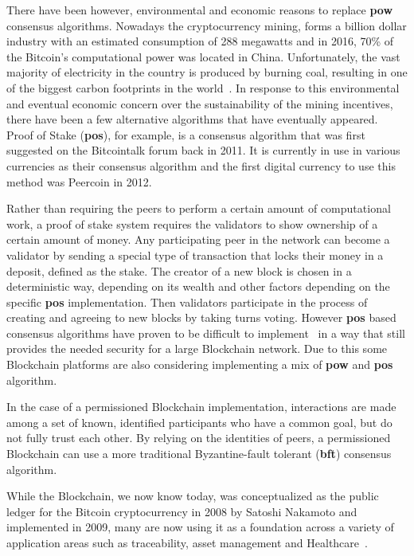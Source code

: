 There have been however, environmental and economic reasons to replace
\textbf{pow} consensus algorithms. Nowadays the cryptocurrency mining, forms a
billion dollar industry with an estimated consumption of 288 megawatts and in
2016, 70\% of the Bitcoin's computational power was located in China.
Unfortunately, the vast majority of electricity in the country is produced by
burning coal, resulting in one of the biggest carbon footprints in the
world~\cite{BitcoinMining2017}. In response to this environmental and eventual
economic concern over the sustainability of the mining incentives, there have
been a few alternative algorithms that have eventually appeared. Proof of Stake
(\textbf{pos}), for example, is a consensus algorithm that was first suggested
on the Bitcointalk forum back in 2011. It is currently in use in various
currencies as their consensus algorithm and the first digital currency to use
this method was Peercoin in 2012. 

Rather than requiring the peers to perform a certain amount of computational
work, a proof of stake system requires the validators to show ownership of a
certain amount of money. Any participating peer in the network can become a
validator by sending a special type of transaction that locks their money in a
deposit, defined as the stake. The creator of a new block is chosen in a
deterministic way, depending on its wealth and other factors depending on the
specific \textbf{pos} implementation. Then validators participate in the
process of creating and agreeing to new blocks by taking turns voting.  However
\textbf{pos} based consensus algorithms have proven to be difficult to
implement~\cite{EthereumSlasher2014} in a way that still provides the needed
security for a large Blockchain network. Due to this some Blockchain platforms
are also considering implementing a mix of \textbf{pow} and \textbf{pos}
algorithm.

In the case of a permissioned Blockchain implementation, interactions are made
among a set of known, identified participants who have a common goal, but do
not fully trust each other. By relying on the identities of peers, a
permissioned Blockchain can use a more traditional Byzantine-fault tolerant
(\textbf{bft}) consensus algorithm.

While the Blockchain, we now know today, was conceptualized as the public
ledger for the Bitcoin cryptocurrency in 2008 by Satoshi Nakamoto and
implemented in 2009, many are now using it as a foundation across a variety of
application areas such as traceability, asset management and
Healthcare~\cite{MIT2016}.

